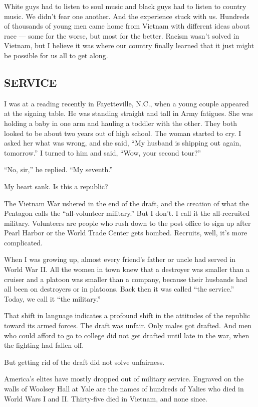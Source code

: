 White guys had to listen to soul music and black guys had to listen to
country music. We didn't fear one another. And the experience stuck with
us. Hundreds of thousands of young men came home from Vietnam with
different ideas about race --- some for the worse, but most for the
better. Racism wasn't solved in Vietnam, but I believe it was where our
country finally learned that it just might be possible for us all to get
along.

\hypertarget{service}{%
\subsection{\texorpdfstring{\textbf{SERVICE}}{SERVICE}}\label{service}}

I was at a reading recently in Fayetteville, N.C., when a young couple
appeared at the signing table. He was standing straight and tall in Army
fatigues. She was holding a baby in one arm and hauling a toddler with
the other. They both looked to be about two years out of high school.
The woman started to cry. I asked her what was wrong, and she said, ``My
husband is shipping out again, tomorrow.'' I turned to him and said,
``Wow, your second tour?''

``No, sir,'' he replied. ``My seventh.''

My heart sank. Is this a republic?

The Vietnam War ushered in the end of the draft, and the creation of
what the Pentagon calls the ``all-volunteer military.'' But I don't. I
call it the all-recruited military. Volunteers are people who rush down
to the post office to sign up after Pearl Harbor or the World Trade
Center gets bombed. Recruits, well, it's more complicated.

When I was growing up, almost every friend's father or uncle had served
in World War II. All the women in town knew that a destroyer was smaller
than a cruiser and a platoon was smaller than a company, because their
husbands had all been on destroyers or in platoons. Back then it was
called ``the service.'' Today, we call it ``the military.''

That shift in language indicates a profound shift in the attitudes of
the republic toward its armed forces. The draft was unfair. Only males
got drafted. And men who could afford to go to college did not get
drafted until late in the war, when the fighting had fallen off.

But getting rid of the draft did not solve unfairness.

America's elites have mostly dropped out of military service. Engraved
on the walls of Woolsey Hall at Yale are the names of hundreds of Yalies
who died in World Wars I and II. Thirty-five died in Vietnam, and none
since.

